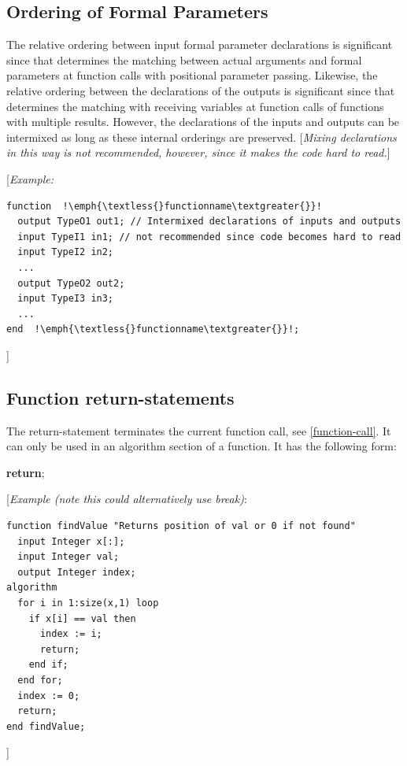 \documentclass[10pt,a4paper]{report}
\def\doublelabel#1{\label{#1}}
\begin{document}
\subsection{Ordering of Formal Parameters}\doublelabel{ordering-of-formal-parameters}

The relative ordering between input formal parameter declarations is
significant since that determines the matching between actual arguments
and formal parameters at function calls with positional parameter
passing. Likewise, the relative ordering between the declarations of the
outputs is significant since that determines the matching with receiving
variables at function calls of functions with multiple results. However,
the declarations of the inputs and outputs can be intermixed as long as
these internal orderings are preserved. {[}\emph{Mixing declarations in
this way is not recommended, however, since it makes the code hard to
read.}{]}

{[}\emph{Example:}



\begin{lstlisting}[language=modelica,escapechar=!]
function  !\emph{\textless{}functionname\textgreater{}}!
  output TypeO1 out1; // Intermixed declarations of inputs and outputs
  input TypeI1 in1; // not recommended since code becomes hard to read
  input TypeI2 in2;
  ...
  output TypeO2 out2;
  input TypeI3 in3;
  ...
end  !\emph{\textless{}functionname\textgreater{}}!;
\end{lstlisting}

{]}

\subsection{Function return-statements}\doublelabel{function-return-statements}

The return-statement terminates the current function call, see \ref{function-call}. 
It can only be used in an algorithm section of a function. It has
the following form:

\textbf{return};

{[}\emph{Example (note this could alternatively use break)}:

\begin{lstlisting}[language=modelica]
function findValue "Returns position of val or 0 if not found"
  input Integer x[:];
  input Integer val;
  output Integer index;
algorithm
  for i in 1:size(x,1) loop
    if x[i] == val then
      index := i;
      return;
    end if;
  end for;
  index := 0;
  return;
end findValue;
\end{lstlisting}
{]}
\end{document}
